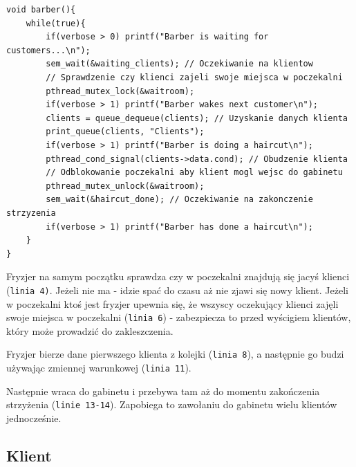 \documentclass[12pt,a4paper]{article}
\begin{document}
	\begin{center}
		\begin{minipage}{0.82\linewidth}
\begin{lstlisting}[caption = Funkcja fryzjera.]
void barber(){
    while(true){
        if(verbose > 0) printf("Barber is waiting for customers...\n");
        sem_wait(&waiting_clients); // Oczekiwanie na klientow
        // Sprawdzenie czy klienci zajeli swoje miejsca w poczekalni
        pthread_mutex_lock(&waitroom);
        if(verbose > 1) printf("Barber wakes next customer\n");
        clients = queue_dequeue(clients); // Uzyskanie danych klienta
        print_queue(clients, "Clients");
        if(verbose > 1) printf("Barber is doing a haircut\n");
        pthread_cond_signal(clients->data.cond); // Obudzenie klienta
        // Odblokowanie poczekalni aby klient mogl wejsc do gabinetu
        pthread_mutex_unlock(&waitroom);
        sem_wait(&haircut_done); // Oczekiwanie na zakonczenie strzyzenia
        if(verbose > 1) printf("Barber has done a haircut\n");
    }
}
\end{lstlisting}
		\end{minipage}
	\end{center}
	
	Fryzjer na samym początku sprawdza czy w poczekalni znajdują się
	jacyś klienci (\texttt{linia 4)}. Jeżeli nie ma - idzie spać do 
	czasu aż nie zjawi się nowy klient. Jeżeli w poczekalni ktoś jest 
	fryzjer upewnia się, że wszyscy oczekujący klienci zajęli swoje 
	miejsca w poczekalni (\texttt{linia 6}) - zabezpiecza to przed
	wyścigiem klientów, który może prowadzić do zakleszczenia.
	
	Fryzjer bierze dane pierwszego klienta z kolejki (\texttt{linia 8}),
	a następnie go budzi używając zmiennej warunkowej 
	(\texttt{linia 11}). 
	
	Następnie wraca do gabinetu i przebywa tam aż
	do momentu zakończenia strzyżenia (\texttt{linie 13-14}). Zapobiega
	to zawołaniu do gabinetu wielu klientów jednocześnie.
	
	\subsection{Klient}
	
\end{document}
